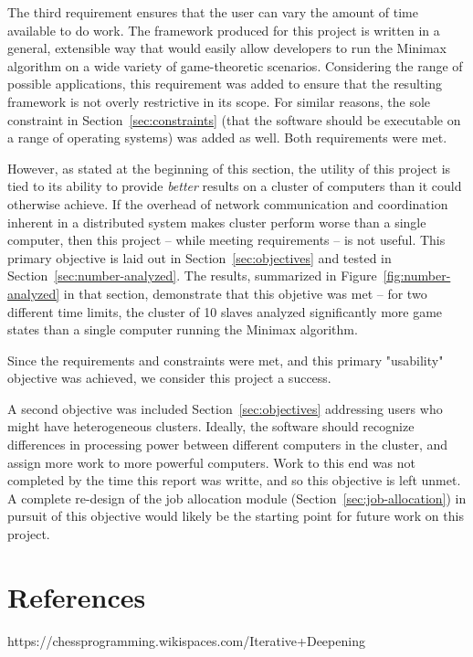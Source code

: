 \documentclass[pdftex,12pt,a4paper]{article}
\begin{document}
The third requirement ensures that the user can vary the amount of time available to do work. The framework produced for this project is written in a general, extensible way that would easily allow developers to run the Minimax algorithm on a wide variety of game-theoretic scenarios. Considering the range of possible applications, this requirement was added to ensure that the resulting framework is not overly restrictive in its scope. For similar reasons, the sole constraint in Section~\ref{sec:constraints} (that the software should be executable on a range of operating systems) was added as well. Both requirements were met.

However, as stated at the beginning of this section, the utility of this project is tied to its ability to provide \emph{better} results on a cluster of computers than it could otherwise achieve. If the overhead of network communication and coordination inherent in a distributed system makes cluster perform worse than a single computer, then this project -- while meeting requirements -- is not useful. This primary objective is laid out in Section~\ref{sec:objectives} and tested in Section~\ref{sec:number-analyzed}. The results, summarized in Figure~\ref{fig:number-analyzed} in that section, demonstrate that this objetive was met -- for two different time limits, the cluster of 10 slaves analyzed significantly more game states than a single computer running the Minimax algorithm.

Since the requirements and constraints were met, and this primary "usability" objective was achieved, we consider this project a success. 

A second objective was included Section~\ref{sec:objectives} addressing users who might have heterogeneous clusters. Ideally, the software should recognize differences in processing power between different computers in the cluster, and assign more work to more powerful computers. Work to this end was not completed by the time this report was writte, and so this objective is left unmet. A complete re-design of the job allocation module (Section~\ref{sec:job-allocation}) in pursuit of this objective would likely be the starting point for future work on this project.

%
%
\pagebreak
\section{References}

https://chessprogramming.wikispaces.com/Iterative+Deepening
\end{document}
